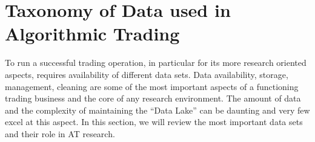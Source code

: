 \section{Taxonomy of Data used in Algorithmic Trading }

To run a successful trading operation, in particular for its more research oriented aspects, requires availability of different data sets. Data availability, storage, management, cleaning are some of the most important aspects of a functioning trading business and the core of any research environment. The amount of data and the complexity of maintaining the ``Data Lake'' can be daunting and very few  excel at this aspect. In this section, we will review the most important data sets and their role in AT research.

